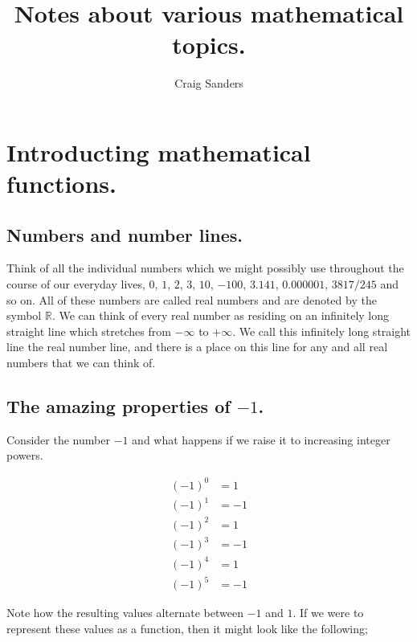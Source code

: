 \documentclass{article}
\title{Notes about various mathematical topics.}
\author{Craig Sanders}
\date{ }
\begin{document}
\newpage

\maketitle

\newpage

\tableofcontents

\newpage

\listoffigures


\newpage

\section{Introducting mathematical functions.}

\subsection{Numbers and number lines.}

Think of all the individual numbers which we might possibly use throughout the course of our everyday lives, $0$, $1$, $2$, 
$3$, $10$, $-100$, $3.141$, $0.000001$, $3817/245$ and so on. All of these numbers are called real numbers and
are denoted by the symbol $\mathbb{R}$.
We can think of every real number as residing on an infinitely long straight line which stretches from
$-\infty$ to $+\infty$. We call this infinitely long straight line the real number line, and there is a place on this
line for any and all real numbers that we can think of.


\subsection{The amazing properties of $-1$.}

Consider the number $-1$ and what happens if we raise it to increasing integer powers.

\begin{align*}
(-1)^{0} &= 1  \\
(-1)^{1} &= -1 \\
(-1)^{2} &= 1  \\
(-1)^{3} &= -1 \\
(-1)^{4} &= 1  \\
(-1)^{5} &= -1
\end{align*}

Note how the resulting values alternate between $-1$ and $1$. If we were to represent these values as a function,
then it might look like the following;
\end{document}
